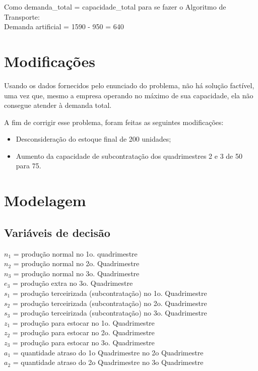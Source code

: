 \documentclass{article}
\begin{document}
Como demanda\_total = capacidade\_total para se fazer o Algoritmo de Transporte: \\
Demanda artificial = 1590 - 950 = 640


\section{Modificações}

Usando os dados fornecidos pelo enunciado do problema, não há solução factível, 
uma vez que, mesmo a empresa operando no máximo de sua capacidade, ela não consegue
atender à demanda total.

A fim de corrigir esse problema, foram feitas as seguintes modificações:

\begin{itemize}

	\item Desconsideração do estoque final de 200 unidades;
	
	\item Aumento da capacidade de subcontratação dos quadrimestres 2 e 3 de 50 para 75.

\end{itemize}




\section{Modelagem}




\subsection{Variáveis de decisão}

$n_1$ = produção normal no 1o. quadrimestre \\
$n_2$ = produção normal no 2o. Quadrimestre \\
$n_3$ = produção normal no 3o. Quadrimestre \\
$e_3$ = produção extra no 3o. Quadrimestre \\
$s_1$ = produção terceirizada (subcontratação) no 1o. Quadrimestre \\
$s_2$ = produção terceirizada (subcontratação) no 2o. Quadrimestre \\
$s_3$ = produção terceirizada (subcontratação) no 3o. Quadrimestre \\
$z_1$ = produção para estocar no 1o. Quadrimestre \\
$z_2$ = produção para estocar no 2o. Quadrimestre \\
$z_3$ = produção para estocar no 3o. Quadrimestre \\
$a_1$ = quantidade atraso do 1o Quadrimestre no 2o Quadrimestre \\
$a_2$ = quantidade atraso do 2o Quadrimestre no 3o Quadrimestre \\
\end{document}
